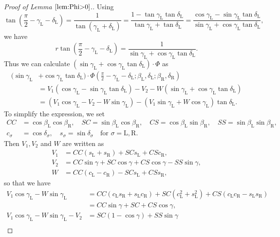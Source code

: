 \documentclass[11pt]{amsart}
\numberwithin{equation}{section}
\numberwithin{theorem}{section}
\newcommand{\Lt}{\ensuremath{\mathrm{L}}}
\newcommand{\Rt}{\ensuremath{\mathrm{R}}}
\begin{document}
\begin{proof}[Proof of Lemma $\ref{lem:Phi>0}$.]
Using
\begin{equation*}
\tan\left(\frac{\pi}{2}-\gamma_\Lt -\delta_\Lt\right) =\frac{1}{\tan (\gamma_\Lt +\delta_\Lt )}
=\frac{1-\tan\gamma_\Lt\tan\delta_\Lt}{\tan\gamma_\Lt +\tan\delta_\Lt}
=\frac{\cos\gamma_\Lt -\sin\gamma_\Lt\tan\delta_\Lt}{\sin\gamma_\Lt +\cos\gamma_\Lt\tan\delta_\Lt},
\end{equation*}
we have 
\begin{equation*}
r\tan\left(\frac{\pi}{2}-\gamma_\Lt -\delta_\Lt\right) =\frac{1}{\sin\gamma_\Lt +\cos\gamma_\Lt\tan\delta_\Lt}.
\end{equation*}
Thus we can calculate $(\sin\gamma_\Lt +\cos\gamma_\Lt\tan\delta_\Lt )\cdot\Phi$ as
\begin{equation}\label{eq:(s+ct)Phi_L}
\begin{aligned}
(\sin\gamma_\Lt &+\cos\gamma_\Lt\tan\delta_\Lt )\cdot\Phi\left(\frac{\pi}{2}-\gamma_\Lt -\delta_\Lt;\beta_\Lt ,\delta_\Lt ;\beta_\Rt ,\delta_\Rt\right)\\
&=V_1(\cos\gamma_\Lt -\sin\gamma_\Lt\tan\delta_\Lt)-V_2-W(\sin\gamma_\Lt +\cos\gamma_\Lt\tan\delta_\Lt )\\
&=(V_1\cos\gamma_\Lt -V_2-W\sin\gamma_\Lt )-(V_1\sin\gamma_\Lt +W\cos\gamma_\Lt )\tan\delta_\Lt .
\end{aligned}
\end{equation}
To simplify the expression, we set
\begin{align*}
CC&=\cos\beta_\Lt\cos\beta_\Rt ,\quad SC=\sin\beta_\Lt\cos\beta_\Rt ,\quad CS=\cos\beta_\Lt\sin\beta_\Rt ,\quad SS=\sin\beta_\Lt\sin\beta_\Rt ,\\
c_\sigma&=\cos\delta_\sigma ,\quad s_\sigma =\sin\delta_\sigma\quad\text{for }\sigma =\Lt ,\Rt .
\end{align*}
Then $V_1,V_2$ and $W$ are written as
\begin{align*}
V_1&=CC(s_\Lt +s_\Rt )+SC s_\Lt +CS c_\Rt ,\\
V_2&=CC\sin\gamma +SC\cos\gamma +CS\cos\gamma -SS\sin\gamma ,\\
W&=CC(c_\Lt -c_\Rt )-SC s_\Lt +CS s_\Rt ,
\end{align*}
so that we have
\begin{align*}
V_1\cos\gamma_\Lt -W\sin\gamma_\Lt&=CC(c_\Lt s_\Rt +s_\Lt c_\Rt )+SC(c_\Lt^2+s_\Lt^2)+CS(c_\Lt c_\Rt -s_\Lt s_\Rt )\\
&=CC\sin\gamma +SC+CS\cos\gamma ,\\
V_1\cos\gamma_\Lt -W\sin\gamma_\Lt -V_2&=SC(1-\cos\gamma )+SS\sin\gamma\\

\end{align*}
\end{proof}
\end{document}
